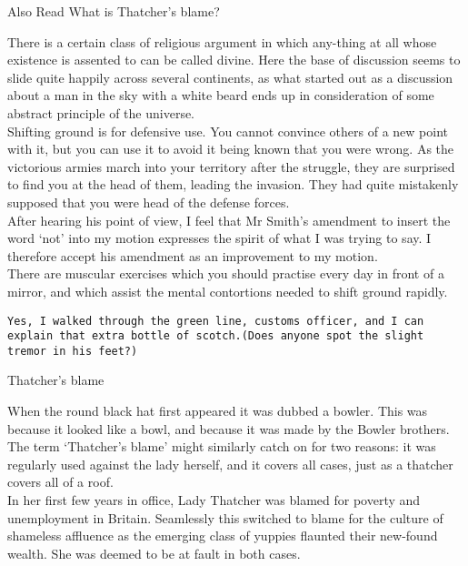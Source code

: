 \documentclass[a4paper,12pt,single,pdftex]{scrartcl}
\begin{document}
    
      

      
        Also Read  What is Thatcher's blame?
      
    
    
      There is a certain class of religious argument in which any-thing at all whose existence is assented to can be called divine. Here the base of discussion seems to slide quite happily across several continents, as what started out as a discussion about a man in the sky with a white beard ends up in consideration of some abstract principle of the universe.
    \\

    
      Shifting ground is for defensive use. You cannot convince others of a new point with it, but you can use it to avoid it being known that you were wrong. As the victorious armies march into your territory after the struggle, they are surprised to find you at the head of them, leading the invasion. They had quite mistakenly supposed that you were head of the defense forces.
    \\

    
      After hearing his point of view, I feel that Mr Smith’s amendment to insert the word ‘not’ into my motion expresses the spirit of what I was trying to say. I therefore accept his amendment as an improvement to my motion.
    \\

    
      There are muscular exercises which you should practise every day in front of a mirror, and which assist the mental contortions needed to shift ground rapidly.
    \\

    \begin{verbatim}Yes, I walked through the green line, customs officer, and I can explain that extra bottle of scotch.(Does anyone spot the slight tremor in his feet?)\end{verbatim}
  

Thatcher’s blame
    
      When the round black hat first appeared it was dubbed a bowler. This was because it looked like a bowl, and because it was made by the Bowler brothers. The term ‘Thatcher’s blame’ might similarly catch on for two reasons: it was regularly used against the lady herself, and it covers all cases, just as a thatcher covers all of a roof.
    \\

    
      In her first few years in office, Lady Thatcher was blamed for poverty and unemployment in Britain. Seamlessly this switched to blame for the culture of shameless affluence as the emerging class of yuppies flaunted their new-found wealth. She was deemed to be at fault in both cases.
    \\
\end{document}
